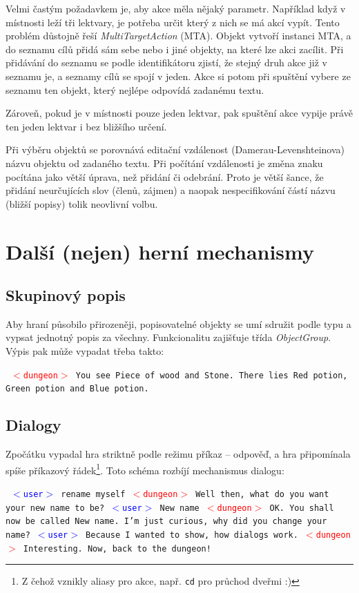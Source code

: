 \documentclass[11pt, a4paper]{article}
\def\class#1{\emph{#1}}
\newenvironment{example}%
{\smallskip\noindent\ignorespaces\obeylines\tt}%
{\smallskip\par\noindent
\ignorespacesafterend}
\def\user{\textcolor{blue}{$<$user$>$ }}
\def\dung{\textcolor{red}{$<$dungeon$>$ }}
\begin{document}
Velmi častým požadavkem je, aby akce měla nějaký parametr. Například když v místnosti leží tři lektvary, je potřeba určit který z nich se má akcí vypít. Tento problém důstojně řeší \class{MultiTargetAction} (MTA). Objekt vytvoří instanci MTA, a do seznamu cílů přidá sám sebe nebo i jiné objekty, na které lze akci zacílit. Při přidávání do seznamu se podle identifikátoru zjistí, že stejný druh akce již v seznamu je, a seznamy cílů se spojí v jeden. Akce si potom při spuštění vybere ze seznamu ten objekt, který nejlépe odpovídá zadanému textu.

Zároveň, pokud je v místnosti pouze jeden lektvar, pak spuštění akce vypije právě ten jeden lektvar i bez bližšího určení.

Při výběru objektů se porovnává editační vzdálenost (Damerau-Levenshteinova) názvu objektu od zadaného textu. Při počítání vzdálenosti je změna znaku pocítána jako větší úprava, než přidání či odebrání. Proto je větší šance, že přidání neurčujících slov (členů, zájmen) a naopak nespecifikování částí názvu (bližší popisy) tolik neovlivní volbu.

\section{Další (nejen) herní mechanismy}

\subsection{Skupinový popis}

Aby hraní působilo přirozeněji, popisovatelné objekty se umí sdružit podle typu a vypsat jednotný popis za všechny. Funkcionalitu zajišťuje třída \class{ObjectGroup}. Výpis pak může vypadat třeba takto:

\begin{example}
\dung You see Piece of wood and Stone. There lies Red potion, Green
potion and Blue potion. 
\end{example}

\subsection{Dialogy}
\label{dialogs}
Zpočátku vypadal hra striktně podle režimu příkaz -- odpověď, a hra připomínala spíše příkazový řádek\footnote{Z čehož vznikly aliasy pro akce, např. \texttt{cd} pro průchod dveřmi :)}. Toto schéma rozbíjí mechanismus dialogu:

\begin{example}
\user rename myself
\dung Well then, what do you want your new name to be?
\user New name
\dung OK. You shall now be called New name. I'm just curious, why did 
you change your name?
\user Because I wanted to show, how dialogs work.
\dung Interesting. Now, back to the dungeon!
\end{example}
\end{document}
